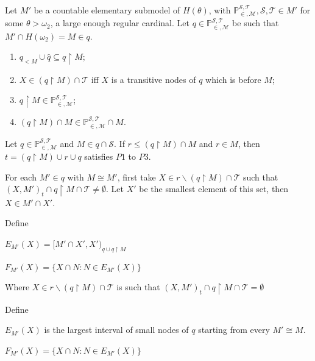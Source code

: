 \documentclass[10pt]{beamer}
\newcommand{\fn}{\mathbb{P}_{\in, \mathcal{M}}^{\mathcal{S}, \mathcal{T}}}
\newcommand{\ms}{\mathcal{S}}
\newcommand{\mt}{\mathcal{T}}
\newcommand{\rest}{{\restriction}}
\begin{document}
\begin{frame}
\begin{lemma}
Let $M'$ be a countable elementary submodel of $H(\theta)$, with $\fn, \ms, \mt \in M'$ for some $\theta > \omega_2$, a large enough regular cardinal. Let $q \in  \fn$ be such that $M' \cap H(\omega_2)=M \in q$.
\begin{enumerate}
\item [$(1)$]
$q_{<M} \cup \hat{q} \subseteq q \rest M$;
\item [$(2)$]
$X \in (q \rest M) \cap \mt$ iff $X$ is a transitive nodes of $q$ which is before $M$;
\item [$(3)$]
$q \rest M \in \fn$;
\item [$(4)$]
$(q \rest M) \cap M \in \fn \cap M$.
\end{enumerate}
\end{lemma}
\begin{lemma}
Let $q \in \fn$ and $M \in q \cap \ms$. If $r \leq (q \rest M) \cap M$ and $r \in M$, then $t=(q \rest M) \cup r \cup q$ satisfies $P1$ to $P3$.
\end{lemma}
\end{frame}
\begin{frame}
For each $M' \in q$ with $M \cong M'$, first take $X \in r\backslash (q \rest M) \cap \mt$ such that $(X, M')_t \cap q\rest M \cap \mt \neq \emptyset$. Let $X'$ be the smallest element of this set, then $X \in M' \cap X'$.
\begin{block}{Define}

$E_{M'}(X)=[M' \cap X', X')_{q \cup q \rest M}$

$F_{M'}(X)= \{ X \cap N : N \in E_{M'}(X)\}$

\end{block}
Where $X \in r \backslash(q \rest M) \cap \mt$ is such that $(X, M')_t \cap q\rest M \cap \mt= \emptyset$

\begin{block}{Define}

$E_{M'}(X)$ is the largest interval of small nodes of $q$ starting from every $M' \cong M$.

$F_{M'}(X)= \{ X \cap N : N \in E_{M'}(X)\}$
\end{block}
\end{frame}
\end{document}
